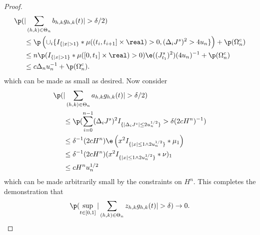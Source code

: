 \begin{proof}
\begin{align}
  \p(&\vert \sumt b_{h,k} \ghk(t) \vert > \delta/2) \notag \\ &\le
\p\left(\cup_i\{I_{\{\vert x \vert > 1\}}\ast \mu( (t_i, t_{i + 1}] \times \real) > 0   , (\djt)^2 > 4u_n\}\right)  + \p(\Omega_n^c)\notag \\
&\le n \p(I_{\{\vert x \vert > 1\}}\ast \mu( [0, t_1] \times \real) > 0) \e(( J^s_{t_1})^2)(4u_n)^{-1} + \p(\Omega_n^c)\notag \\
&\le c \Delta_n u^{-1}_n + \p(\Omega_n^c).
\end{align}
which can be made as small as desired. Now consider
\begin{align}
  \p(&\vert \sumt a_{h,k} \ghk(t) \vert > \delta/2) \notag \\ &\le \p( \sumin (\djt)^2 I_{\{\vert \djt \vert \le 2u_n^{1/2} \}} > \delta (2 c H^n)^{-1} )\notag\\
  &\le\delta^{-1} (2 c H^n)\e\left( x^2I_{\{\vert x\vert \le 1 \wedge 2 u_n^{1/2}\}}\ast\mu_1  \right)\notag \\
  &\le \delta^{-1} (2 c H^n) (x^2I_{\{\vert x\vert \le 1 \wedge 2 u_n^{1/2}\}}\ast\nu)_1\notag \\
  &\le c H^n u^{1/2}_n \notag
\notag
\end{align}
which can be made arbitrarily small by the constraints on $H^n$. This completes the demonstration that  
\begin{align}
  \p(\sup_{t \in [0,1]}\vert \sumt z_{h,k} \ghk(t) \vert > \delta) \to 0.\label{eq:z}
\end{align}
\begin{comment}
Meanwhile, on $A_i \cap C_i$, it is easily seen that $\vert \djl \vert - \vert \dxc + \djt \vert < \vert \dx \vert \le u_n^{1/2}$, so that
\begin{align}
  \notag
  \dxf \djt I_{A_i \cap C_i} &\le \dxf \djt I_{\{\vert \djl \vert \le 4 u^{1/2}_n\}}\\
   &\le \dxc \djt I_{\{\vert \djl \vert \le 4 u^{1/2}_n\}} +  \djl \djt I_{\{\vert \djl \vert \le 4 u^{1/2}_n\}}\notag\\
   & =: \theta_i^1 + \theta_i^2\notag. 
  \label{}
\end{align}
Arguing as above, it is easily verified that $\e(\theta_i^1)  \le c \Delta_n^{5/4} u_n^{-1/8}$  so that 
\begin{align} 
  \p( \sup_{t \in \domain}\vert \sumt \sumin \btghki \theta^1_i \ghk(t)\vert > \eta) \le cH^n (u^{-1/2}_n\Delta_n)^{1/4} \notag \end{align}

\end{comment}
\end{proof}
